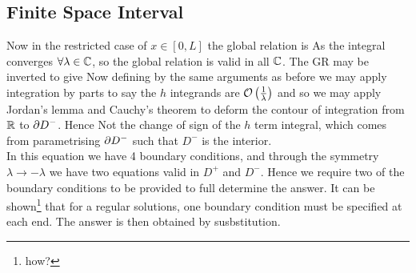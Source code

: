\documentclass{article}
\begin{document}
\subsection{Finite Space Interval}
Now in the restricted case of $x \in [0,L]$ the global relation is 
As 
the integral converges $\forall \lambda \in \mathbb{C}$, so the global relation is valid in all $\mathbb{C}$. The GR may be inverted to give 
Now defining 
by the same arguments as before we may apply integration by parts to say the $h$ integrands are $\mathcal{O}\left( \frac{1}{\lambda} \right)$ and so we may apply Jordan's lemma and Cauchy's theorem to deform the contour of integration from $\mathbb{R}$ to $\partial D^-$. Hence 
Not the change of sign of the $h$ term integral, which comes from parametrising $\partial D^-$ such that $D^-$ is the interior. \\
In this equation we have 4 boundary conditions, and through the symmetry $\lambda \to -\lambda$ we have two equations valid in $D^+$ and $D^-$. Hence we require two of the boundary conditions to be provided to full determine the answer. It can be shown\footnote{how?} that for a regular solutions, one boundary condition must be specified at each end. The answer is then obtained by susbstitution.  
\end{document}
